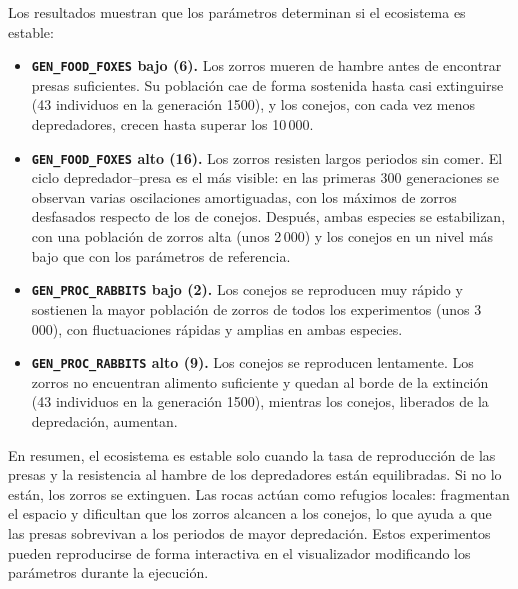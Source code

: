 
Los resultados muestran que los parámetros determinan si el ecosistema es estable:
\begin{itemize}[nosep]
  \item \textbf{\texttt{GEN\_FOOD\_FOXES} bajo (6).} Los zorros mueren de hambre antes de encontrar presas
    suficientes. Su población cae de forma sostenida hasta casi extinguirse (43 individuos en la generación
    1500), y los conejos, con cada vez menos depredadores, crecen hasta superar los 10\,000.
  \item \textbf{\texttt{GEN\_FOOD\_FOXES} alto (16).} Los zorros resisten largos periodos sin comer. El
    ciclo depredador--presa es el más visible: en las primeras 300 generaciones se observan varias
    oscilaciones amortiguadas, con los máximos de zorros desfasados respecto de los de conejos. Después,
    ambas especies se estabilizan, con una población de zorros alta (unos 2\,000) y los conejos en un nivel
    más bajo que con los parámetros de referencia.
  \item \textbf{\texttt{GEN\_PROC\_RABBITS} bajo (2).} Los conejos se reproducen muy rápido y sostienen la
    mayor población de zorros de todos los experimentos (unos 3\,000), con fluctuaciones rápidas y amplias
    en ambas especies.
  \item \textbf{\texttt{GEN\_PROC\_RABBITS} alto (9).} Los conejos se reproducen lentamente. Los zorros no
    encuentran alimento suficiente y quedan al borde de la extinción (43 individuos en la generación 1500),
    mientras los conejos, liberados de la depredación, aumentan.
\end{itemize}
En resumen, el ecosistema es estable solo cuando la tasa de reproducción de las presas y la resistencia
al hambre de los depredadores están equilibradas. Si no lo están, los zorros se extinguen. Las rocas actúan
como refugios locales: fragmentan el espacio y dificultan que los zorros alcancen a los conejos, lo que
ayuda a que las presas sobrevivan a los periodos de mayor depredación. Estos experimentos pueden
reproducirse de forma interactiva en el visualizador modificando los parámetros durante la ejecución.
